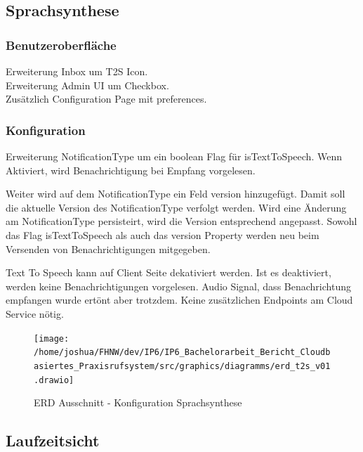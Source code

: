 \subsection{Sprachsynthese}

\subsubsection*{Benutzeroberfläche}

Erweiterung Inbox um T2S Icon. \\
Erweiterung Admin UI um Checkbox. \\
Zusätzlich Configuration Page mit preferences. \\

\subsubsection*{Konfiguration}

Erweiterung NotificationType um ein boolean Flag für isTextToSpeech.
Wenn Aktiviert, wird Benachrichtigung bei Empfang vorgelesen.

Weiter wird auf dem NotificationType ein Feld version hinzugefügt.
Damit soll die aktuelle Version des NotificationType verfolgt werden.
Wird eine Änderung am NotificationType persisteirt, wird die Version entsprechend angepasst.
Sowohl das Flag isTextToSpeech als auch das version Property werden neu beim Versenden von Benachrichtigungen mitgegeben.

Text To Speech kann auf Client Seite dekativiert werden.
Ist es deaktiviert, werden keine Benachrichtigungen vorgelesen.
Audio Signal, dass Benachrichtung empfangen wurde ertönt aber trotzdem.
Keine zusätzlichen Endpoints am Cloud Service nötig. \\

\begin{figure}[h]
    \centering
    \begin{minipage}[b]{0.75\textwidth}
        \texttt{[image: /home/joshua/FHNW/dev/IP6/IP6\_Bachelorarbeit\_Bericht\_Cloudbasiertes\_Praxisrufsystem/src/graphics/diagramms/erd\_t2s\_v01.drawio]}
        \caption{ERD Ausschnitt - Konfiguration Sprachsynthese}
    \end{minipage}
\end{figure}



\clearpage

\subsection*{Laufzeitsicht}

